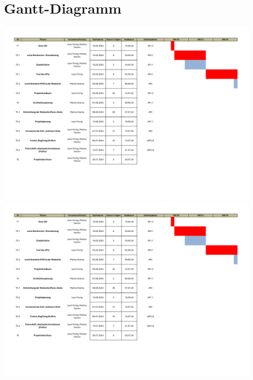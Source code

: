 \documentclass[12pt]{article}
\begin{document}
\section{Gantt-Diagramm}
\includegraphics[width=\textwidth, page=1]{Planungsdokumente/graphics/Gantt_Diagramm.pdf}
\includegraphics[width=\textwidth, page=2]{Planungsdokumente/graphics/Gantt_Diagramm.pdf}
\end{document}
